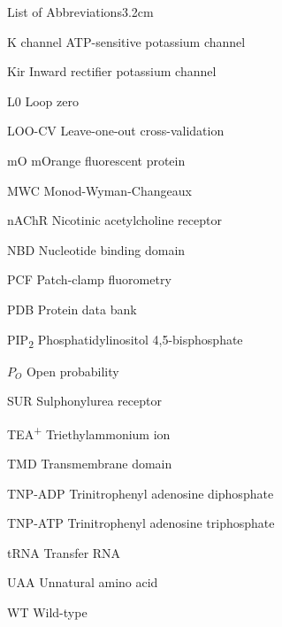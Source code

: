 \begin{mclistof}{List of Abbreviations}{3.2cm}
\item[K\ATP{} channel] ATP-sensitive potassium channel

\item[Kir] Inward rectifier potassium channel

\item[L0] Loop zero

\item[LOO-CV] Leave-one-out cross-validation

\item[mO] mOrange fluorescent protein

\item[MWC] Monod-Wyman-Changeaux

\item[nAChR] Nicotinic acetylcholine receptor

\item[NBD] Nucleotide binding domain

\item[PCF] Patch-clamp fluorometry

\item[PDB] Protein data bank

\item[PIP\textsubscript{2}] Phosphatidylinositol 4,5-bisphosphate

\item[$P_O$] Open probability

\item[SUR] Sulphonylurea receptor

\item[TEA\textsuperscript{+}] Triethylammonium ion

\item[TMD] Transmembrane domain

\item[TNP-ADP] Trinitrophenyl adenosine diphosphate

\item[TNP-ATP] Trinitrophenyl adenosine triphosphate

\item[tRNA] Transfer RNA

\item[UAA] Unnatural amino acid

\item[WT] Wild-type

\end{mclistof}

